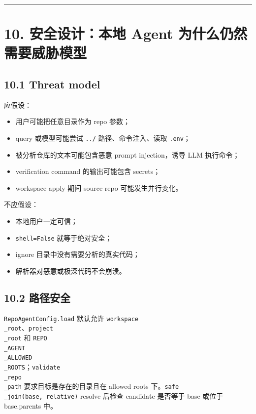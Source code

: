 \documentclass[UTF8,12pt,openany]{ctexbook}
\begin{document}
\hrule

\section{10. 安全设计：本地 Agent 为什么仍然需要威胁模型}

\subsection{10.1 Threat model}

应假设：\par

\begin{itemize}
\item 用户可能把任意目录作为 repo 参数；
\item query 或模型可能尝试 \texttt{../} 路径、命令注入、读取 \texttt{.env}；
\item 被分析仓库的文本可能包含恶意 prompt injection，诱导 LLM 执行命令；
\item verification command 的输出可能包含 secrets；
\item workspace apply 期间 source repo 可能发生并行变化。
\end{itemize}

不应假设：\par

\begin{itemize}
\item 本地用户一定可信；
\item \texttt{shell=False} 就等于绝对安全；
\item ignore 目录中没有需要分析的真实代码；
\item 解析器对恶意或极深代码不会崩溃。
\end{itemize}

\subsection{10.2 路径安全}

\texttt{RepoAgentConfig.load} 默认允许 \texttt{workspace\\_root}、\texttt{project\\_root} 和 \texttt{REPO\\_AGENT\\_ALLOWED\\_ROOTS}；\texttt{validate\\_repo\\_path} 要求目标是存在的目录且在 allowed roots 下。\texttt{safe\\_join(base, relative)} resolve 后检查 candidate 是否等于 base 或位于 base.parents 中。\par
\end{document}
